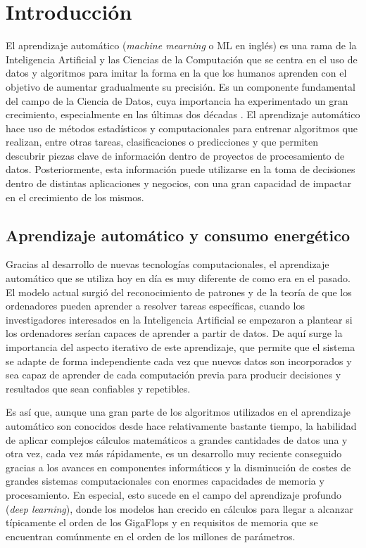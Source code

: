 \chapter{Introducción}
\label{sec:intro}

El aprendizaje automático (\emph{machine mearning} o ML en inglés) es una rama de la Inteligencia Artificial y las Ciencias de la Computación que se centra en el uso de datos y algoritmos para imitar la forma en la que los humanos aprenden con el objetivo de aumentar gradualmente su precisión.
Es un componente fundamental del campo de la Ciencia de Datos, cuya importancia ha experimentado un gran crecimiento, especialmente en las últimas dos décadas \cite{cleveland2001}. 
El aprendizaje automático hace uso de métodos estadísticos y computacionales para entrenar algoritmos que realizan, entre otras tareas, clasificaciones o predicciones y que permiten descubrir piezas clave de información dentro de proyectos de procesamiento de datos. 
Posteriormente, esta información puede utilizarse en la toma de decisiones dentro de distintas aplicaciones y negocios, con una gran capacidad de impactar en el crecimiento de los mismos.

\section{Aprendizaje automático y consumo energético}

Gracias al desarrollo de nuevas tecnologías computacionales, el aprendizaje automático que se utiliza hoy en día es muy diferente de como era en el pasado.
El modelo actual surgió del reconocimiento de patrones y de la teoría de que los ordenadores pueden aprender a resolver tareas específicas, cuando los investigadores interesados en la Inteligencia Artificial se empezaron a plantear si los ordenadores serían capaces de aprender a partir de datos.
De aquí surge la importancia del aspecto iterativo de este aprendizaje, que permite que el sistema se adapte de forma independiente cada vez que nuevos datos son incorporados y sea capaz de aprender de cada computación previa para producir decisiones y resultados que sean confiables y repetibles.

Es así que, aunque una gran parte de los algoritmos utilizados en el aprendizaje automático son conocidos desde hace relativamente bastante tiempo, la habilidad de aplicar complejos cálculos matemáticos a grandes cantidades de datos una y otra vez, cada vez más rápidamente, es un desarrollo muy reciente conseguido gracias a los avances en componentes informáticos y la disminución de costes de grandes sistemas computacionales con enormes capacidades de memoria y procesamiento.
En especial, esto sucede en el campo del aprendizaje profundo (\emph{deep learning}), donde los modelos han crecido en cálculos para llegar a alcanzar típicamente el orden de los GigaFlops y en requisitos de memoria que se encuentran comúnmente en el orden de los millones de parámetros.

